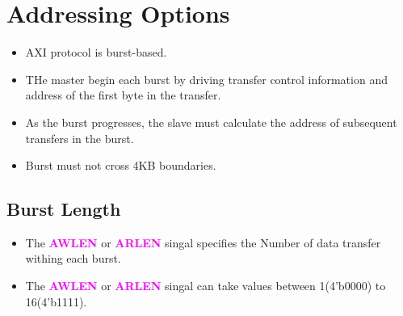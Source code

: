 \documentclass{article}
\newcommand{\AXISignals}[1]{\textbf{\textcolor{magenta}{#1}}}
\begin{document}
\section{Addressing Options}
\begin{itemize}
    \item AXI protocol is burst-based.
    \item THe master begin each burst by driving transfer control information and address of the first byte in the transfer.
    \item As the burst progresses, the slave must calculate the address of subsequent transfers in the burst.
    \item Burst must not cross 4KB boundaries.
\end{itemize}

\subsection{Burst Length}
\begin{itemize}
    \item The \AXISignals{AWLEN} or \AXISignals{ARLEN} singal specifies the Number of data transfer withing each burst.
    \item The \AXISignals{AWLEN} or \AXISignals{ARLEN} singal can take values between 1(4'b0000) to 16(4'b1111).
\end{itemize}
\end{document}
